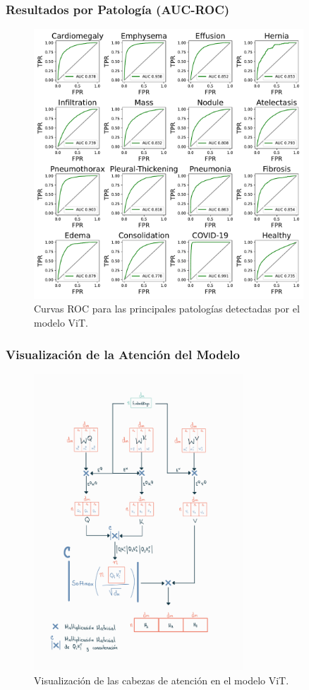 \begin{frame}
\frametitle{Resultados por Patología (AUC-ROC)}
\begin{figure}[ht!]
    \centering
    \includegraphics[width=0.9\textwidth]{../Chapters/4. ViT-Lung/images/ROC_AUC_ViT.pdf}
    \caption{Curvas ROC para las principales patologías detectadas por el modelo ViT.}
\end{figure}
\end{frame}

\begin{frame}
\frametitle{Visualización de la Atención del Modelo}
\begin{figure}[ht!]
    \centering
    \includegraphics[width=0.7\textwidth]{../Chapters/4. ViT-Lung/images/cabezas_vit.jpg}
    \caption{Visualización de las cabezas de atención en el modelo ViT.}
\end{figure}
\end{frame}

